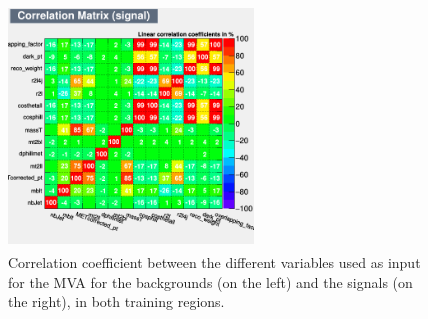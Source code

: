 \documentclass[a4paper, 10pt, openright]{report}
\begin{document}
\begin{figure}[htbp]
{\begin{minipage}[b]{.49\textwidth}
\end{minipage}\hfill
\begin{minipage}[b]{.49\textwidth}
\includegraphics[width=6.5cm, height=6.5cm]{figs/corr_signal_TTbar.png}
\end{minipage} \hfill
}
\caption{Correlation coefficient between the different variables used as input for the \ac{MVA} for the backgrounds (on the left) and the signals (on the right), in both training regions.}
\label{fig:correlationVar}
\end{figure}
\end{document}
